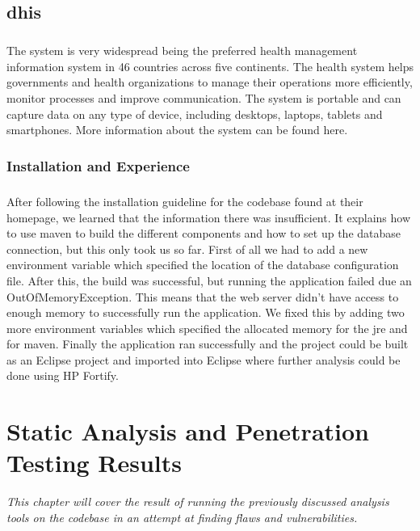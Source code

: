 \documentclass[11pt,english,a4paper]{report}
\begin{document}
\section{\gls{dhis}}
\paragraph{}
The system is very widespread being the preferred health management information system in 46 countries across five continents. 
The health system helps governments and health organizations to manage their operations more efficiently, monitor processes and improve communication. 
The system is portable and can capture data on any type of device, including desktops, laptops, tablets and smartphones. 
More information about the system can be found here. \cite{dhis2-homepage, dhis2-wiki}

\subsection{Installation and Experience}
\paragraph{}
After following the installation guideline for the codebase found at their homepage, we learned that the information there was insufficient.
It explains how to use \gls{maven} to build the different components and how to set up the database connection, but this only took us so far.
First of all we had to add a new environment variable which specified the location of the database configuration file.
After this, the build was successful, but running the application failed due an OutOfMemoryException. 
This means that the web server didn't have access to enough memory to successfully run the application. 
We fixed this by adding two more environment variables which specified the allocated memory for the \gls{jre} and for \gls{maven}.
Finally the application ran successfully and the project could be built as an Eclipse project and imported into Eclipse where further analysis could be done using HP Fortify.



\chapter{Static Analysis and Penetration Testing Results}
\textit{This chapter will cover the result of running the previously discussed analysis tools on the codebase in an attempt at finding flaws and vulnerabilities.}
\end{document}
